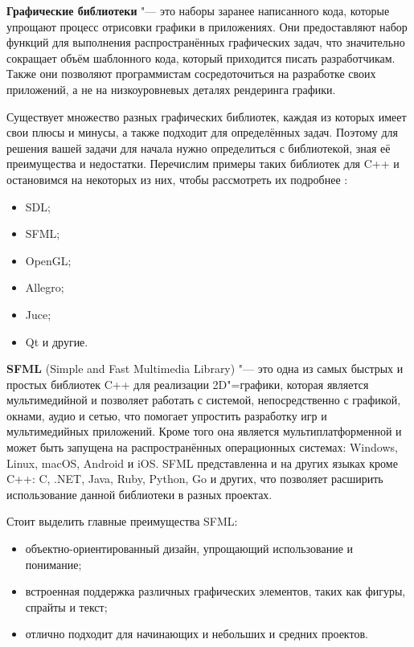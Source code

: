 \textbf{Графические библиотеки} "--- это наборы заранее написанного кода, которые упрощают процесс отрисовки графики в приложениях. Они предоставляют набор функций для выполнения распространённых графических задач, что значительно сокращает объём шаблонного кода, который приходится писать разработчикам. Также они позволяют программистам сосредоточиться на разработке своих приложений, а не на низкоуровневых деталях рендеринга графики.

Существует множество разных графических библиотек, каждая из которых имеет свои плюсы и минусы, а также подходит для определённых задач. Поэтому для решения вашей задачи для начала нужно определиться с библиотекой, зная её преимущества и недостатки. Перечислим примеры таких библиотек для C++ и остановимся на некоторых из них, чтобы рассмотреть их подробнее \cite{graphics_libraries}:
\begin{itemize}
    \item SDL;
    \item SFML;
    \item OpenGL;
    \item Allegro;
    \item Juce;
    \item Qt и другие.
\end{itemize}

\textbf{SFML} (Simple and Fast Multimedia Library) "--- это одна из самых быстрых и простых библиотек C++ для реализации 2D"=графики, которая является мультимедийной и позволяет работать с системой, непосредственно с графикой, окнами, аудио и сетью, что помогает упростить разработку игр и мультимедийных приложений. Кроме того она является мультиплатформенной и может быть запущена на распространённых операционных системах: Windows, Linux, macOS, Android и iOS. SFML представленна и на других языках кроме C++: C, .NET, Java, Ruby, Python, Go и других, что позволяет расширить использование данной библиотеки в разных проектах. \cite{sfml_doc}

Стоит выделить главные преимущества SFML:
\begin{itemize}
    \item объектно-ориентированный дизайн, упрощающий использование и понимание;
    \item встроенная поддержка различных графических элементов, таких как фигуры, спрайты и текст;
    \item отлично подходит для начинающих и небольших и средних проектов.
\end{itemize}

